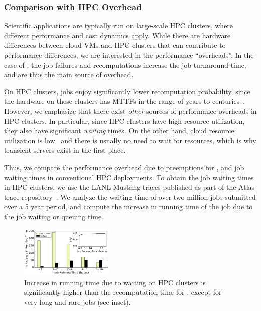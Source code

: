 \subsubsection{Comparison with HPC Overhead}

Scientific applications are typically run on large-scale HPC clusters, where different performance and cost dynamics apply.
While there are hardware differences between cloud VMs and HPC clusters that can contribute to performance differences, we are interested in the performance ``overheads''.
In the case of \sysname, the job failures and recomputations increase the job turnaround time, and are thus the main source of overhead.

On HPC clusters, jobs enjoy significantly lower recomputation probability, since the hardware on these clusters has MTTFs in the range of years to centuries~\cite{dongarra-ckpting}.
However, we emphasize that there exist \emph{other} sources of performance overheads in HPC clusters.
In particular, since HPC clusters have high resource utilization, they also have significant \emph{waiting} times. 
On the other hand, cloud resource utilization is low~\cite{borg} and there is usually no need to wait for resources, which is why transient servers exist in the first place. 


Thus, we compare the performance overhead due to preemptions for \sysname, and job waiting times in conventional HPC deployments.
To obtain the job waiting times in HPC clusters, we use the LANL Mustang traces published as part of the Atlas trace repository~\cite{cmu-atlas}.
We analyze the waiting time of over two million jobs submitted over a 5 year period, and compute the increase in running time of the job due to the job waiting or queuing time. 

\begin{figure}[t]
  \centering 
  \includegraphics[width=0.4\textwidth]{../graphs/hpc-vs-scispot.pdf}
      \vspace*{\myfigspace}
  \caption{Increase in running time due to waiting on HPC clusters is significantly higher than the recomputation time for \sysname, except for very long and rare jobs (see inset). }
  \label{fig:hpc-vs-scispot}
  \vspace*{\myfigspace}
\end{figure}


